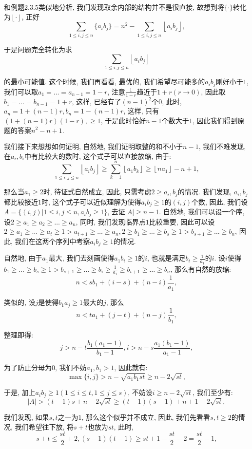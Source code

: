 \documentclass[lang=cn,12pt,thmcnt=section]{elegantbook}
\newcommand{\fl}[1]{\left\lfloor #1\right\rfloor}
\begin{document}
\begin{analysis}
和例题2.3.5类似地分析, 我们发现取余内部的结构并不是很直接, 故想到将$\{\cdot{}\}$转化为$\fl{\cdot{}}$, 正好
\[
\sum_{1\le i,j\le n}\{a_ib_j\}=n^2-\sum_{1\le i,j\le n}\fl{a_ib_j},
\]

于是问题完全转化为求
\[
\sum_{1\le i,j\le n}\fl{a_ib_j}
\]

的最小可能值. 这个时候, 我们再看看, 最优的, 我们希望尽可能多的$a_ib_j$刚好小于$1$, 我们可以取$a_1=\dots{}=a_{n-1}=1-r$, 注意$\frac{1}{1-r}$趋近于$1+r(r\to 0)$, 因此取$b_1=\dots{}=b_{n-1}=1+r$, 这样, 已经有了$(n-1)^2$个$0$, 此时, $a_n=1+(n-1)r,b_n=1-(n-1)r$, 这样, 只有$(1+(n-1)r)(1-r),\ge 1$, 于是此时恰好$n-1$个数大于$1$, 因此我们得到原题的答案$n^2-n+1$. 

我们接下来想想如何证明, 自然地, 我们证明取整的和不小于$n-1$, 我们不难发现, 在$a_i,b_i$中有比较大的数时, 这个式子可以直接放缩, 由于: 
\[
\sum_{1\le i,j\le n}\fl{a_ib_j}\ge \sum_{k=1}^n \fl{a_1b_k}\ge \fl{na_1}-n+1,
\]

那么当$a_1\ge 2$时, 待证式自然成立, 因此, 只需考虑$2\ge a_i,b_j$的情况. 我们发现, $a_i,b_j$都比较接近$1$时, 这个式子可以近似理解为使得$a_ib_j\ge 1$的$(i,j)$个数, 因此, 我们设$A=\{(i,j)|1\le i,j\le n,a_ib_j\ge 1\}$, 去证$|A|\ge n-1$. 自然地, 我们可以设一个序, 设$2\ge a_1\ge a_2\ge \dots{}\ge a_n$, 同时, 我们发现临界点$1$比较重要, 因此可以设$2\ge a_1\ge \dots{}\ge a_t\ge 1>a_{t+1}\ge \dots{}\ge a_n,2\ge b_1\ge \dots{}\ge b_s\ge 1>b_{s+1}\ge \dots{}\ge b_n$, 因此, 我们在这两个序列中考察$a_ib_j\ge 1$的情况.

自然地, 由于$a_1$最大, 我们去刻画使得$a_1b_i\ge 1$的$i$, 也就是满足$b_i\ge \frac{1}{a_1}$的$i$. 设$i$使得$b_1\ge \dots{}\ge b_s\ge 1>b_{s+1}\ge \dots{}\ge b_i\ge \frac{1}{a_1}\ge b_{i+1}\ge \dots{}\ge b_n$, 那么有自然的放缩:
\[
n< sb_1+(i-s)+(n-i)\frac{1}{a_1},
\]

类似的, 设$j$是使得$b_1a_j\ge 1$最大的$j$, 那么
\[
n< ta_1+(j-t)+(n-j)\frac{1}{b_1},
\]

整理即得:
\[
j> n-t\frac{b_1(a_1-1)}{b_1-1},i> n-s\frac{a_1(b_1-1)}{a_1-1},
\]

为了防止分母为$0$, 我们不妨$a_1,b_1> 1$, 因此就有: 
\[
\max\{i,j\}> n-\sqrt{a_1b_1st}\ge n-2\sqrt{st},
\]

于是, 加上$a_ib_j\ge 1(1\le i\le t,1\le j\le s)$, 不妨设$i\ge n-2\sqrt{st}$, 我们至少有: 
\[
|A|> (t-1)s+n-2\sqrt{st}\ge (t-1)(s-1)+n+1-2\sqrt{st},
\]

我们发现, 如果$s,t$之一为$1$, 那么这个似乎并不成立, 因此, 我们先看看$s,t\ge 2$的情况, 我们希望往下放, 将$s+t$也放为$st$, 此时, 
\[
s+t\le \frac{st}{2}+2,(s-1)(t-1)\ge st+1-\frac{st}{2}-2=\frac{st}{2}-1,
\]


\end{analysis}
\end{document}
